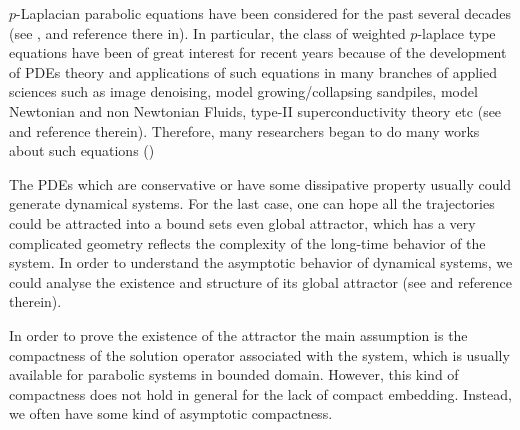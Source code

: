 \documentclass[11pt]{amsart}
\theoremstyle{definition}
\numberwithin{equation}{section}
\begin{document}
$p$-Laplacian parabolic equations have been considered for the past several decades
(see \autocite{liuAsymptoticRegularityPLaplacian2010,zhongZ2IndexGlobal2010,acerbiRegularityResultsStationary2002,rajagopalMathematicalModelingElectrorheological2001,aboulaichNewDiffusionModels2008,guoSingularPhenomenaSolutions2015,antontsevUniquenessComparisonTheorems2013,gaoExistenceUniquenessNonexistence2016,liuNonlinearDiffusionProblem2019,guoStudyWeakSolutions2011,antontsevParabolicEquationsAnisotropic2007,constantinGlobalExistenceFully2006,constantinGlobalSolutionsQuasilinear2002},
and reference there in).
In particular, the class of weighted $p$-laplace type equations have been of great interest for recent years
because of the development of PDEs theory and applications of such equations in
many branches of applied sciences such as image
denoising, model growing/collapsing sandpiles,
model Newtonian and non Newtonian Fluids, type-II superconductivity theory etc
(see \autocite{aronssonFastSlowDiffusion1996,aubertMathematicalProblemsImage2006,mastorakisSolutionPLaplacianNonNewtonian2009,yinLaplacianTypeEvolution2001} and reference therein).
Therefore, many researchers began to do many works about such equations
(\autocite{cortazarExistenceSignChanging2014,musinaExistenceMultiplicityResults2009,gazziniSobolevtypeInequalityRelated2009,liLongtimeBehaviorClass2014b,maGlobalAttractorsWeighted2012a,cavalheiroWeightedSobolevSpaces2008,caldiroliVariationalDegenerateElliptic2000,leBoundaryValueProblems1998,monticelliMaximumPrinciplesWeak2009,dibenedettoDegenerateSingularParabolic1993,galClassDegenerateParabolic2012,yinEvolutionaryWeightedPLaplacian2007,Zhan2019Uniquenessa})

The PDEs which are conservative or have some dissipative property
usually could generate dynamical systems. For the last case, one can
hope all the trajectories could be attracted into a bound sets even
global attractor, which has a very complicated geometry reflects the
complexity of the long-time behavior of the system. In order to
understand the asymptotic behavior of dynamical systems, we could
analyse the existence and structure of its global attractor
(see \autocite{cholewaGlobalAttractorsAbstract2000a,chueshovIntroductionTheoryInfinitedimensional2002,robinsonInfiniteDimensionalDynamicalSystems2001a,temamInfiniteDimensionalDynamicalSystems1997} and reference therein).

In order to prove the existence of the attractor the main assumption is
the compactness of the solution operator associated with the system,
which is usually available for parabolic systems in bounded domain.
However, this kind of compactness does not hold in general for the
lack of compact embedding. Instead, we often have some kind of
asymptotic compactness.
\end{document}
